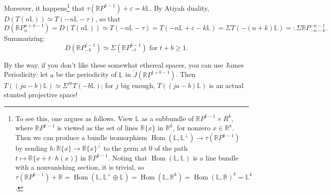 \documentclass{article}
\newcommand{\Z}{\mathbb{Z}}
\newcommand{\R}{\mathbb{R}}
\newcommand{\RP}{\R P}
\newcommand{\bundle}[1]{\mathbb{#1}}
\newcommand{\Suspend}{\Sigma}
\DeclareMathOperator{\Hom}{Hom}
\renewcommand{\to}{\longrightarrow}
\renewcommand{\mapsto}{\longmapsto}
\theoremstyle{definition}
\begin{document}
Moreover, it happens\footnote{To see this, one argues as follows. View $\bundle{L}$ as a subbundle of $\RP^{k-1}\times R^k$, where $\RP^{k-1}$ is viewed as the set of lines $\R\{x\}$ in $\R^k$, for nonzero $x\in\R^k$. Then we can produce a bundle isomorphism $\Hom(\bundle{L},\bundle{L}^\perp)\to\tau(\RP^{k-1})$ by sending $h:\R\{x\}\to \R\{x\}^\perp$ to the germ at $0$ of the path $t\mapsto \R\{x+t\cdot h(x)\}$ in $\RP^{k-1}$. Noting that $\Hom(\bundle L,\bundle L)$ is a line bundle with a nonvanishing section, it is trivial, so $\tau(\RP^{k-1})+\R=\Hom(\bundle L,\bundle L^\perp\oplus\bundle L)=\Hom(\bundle L,\R^k)=\Hom(\bundle L,\R)^k=\bundle L^k$.} that $\tau(\RP^{k-1}) + \varepsilon = k \bundle{L}$.
By Atiyah duality, $D(T(n\bundle{L})) \simeq T(-n \bundle{L} - \tau)$, so that
\[D(\RP^{n+k-1}_n) = D(T(n\bundle{L})) \simeq T(-n \bundle{L} - \tau) = T(-n \bundle{L} + \varepsilon -k \bundle{L}) = \Suspend T(-(n+k)\bundle{L}) =: \Suspend \RP^{-n-1}_{-n-k}.\]
Summarizing:
\[D(\RP^{t-1}_{-b}) \simeq \Suspend (\RP^{b-1}_{-t})\text{ for }t+b\geq1.\]

By the way, if you don't like these somewhat ethereal spaces, you can use James Periodicity: let $a$ be the periodicity of $\bundle{L}$ in $\widetilde J(\RP^{t+b-1})$.  Then $T((ja-b)\bundle{L}) \simeq \Suspend^{ja} T(-b \bundle{L})$; for $j$ big enough, $T((ja-b)\bundle{L})$ is an actual stunted projective space!
\end{document}
